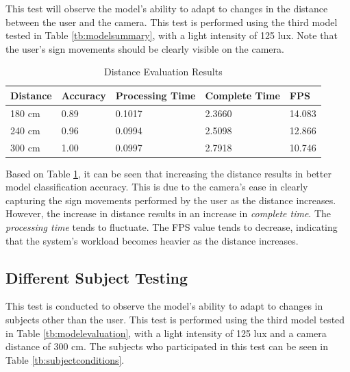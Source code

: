 This test will observe the model's ability to adapt to changes in the distance between the user and the camera. This test is performed using the third model tested in Table \ref{tb:modelsummary}, with a light intensity of 125 lux. Note that the user's sign movements should be clearly visible on the camera.

\begin{table}[H]
  \caption{Distance Evaluation Results}
  \label{tb:distanceevaluation}
  \centering
  \begin{tabular}{lllll}
    \hline
    \textbf{Distance} & \textbf{Accuracy} & \textbf{Processing Time} & \textbf{Complete Time} & \textbf{FPS} \\
    \hline
    180 cm & 0.89 & 0.1017 & 2.3660 & 14.083\\
    240 cm & 0.96 & 0.0994 & 2.5098 & 12.866\\
    300 cm & 1.00 & 0.0997 & 2.7918 & 10.746\\
    \hline
  \end{tabular}
\end{table}

Based on Table \ref{tb:distanceevaluation}, it can be seen that increasing the distance results in better model classification accuracy. This is due to the camera's ease in clearly capturing the sign movements performed by the user as the distance increases. However, the increase in distance results in an increase in \emph{complete time}. The \emph{processing time} tends to fluctuate. The FPS value tends to decrease, indicating that the system's workload becomes heavier as the distance increases.

\subsection{Different Subject Testing}
\label{sec:subjectanalysis}

This test is conducted to observe the model's ability to adapt to changes in subjects other than the user. This test is performed using the third model tested in Table \ref{tb:modelevaluation}, with a light intensity of 125 lux and a camera distance of 300 cm. The subjects who participated in this test can be seen in Table \ref{tb:subjectconditions}.

